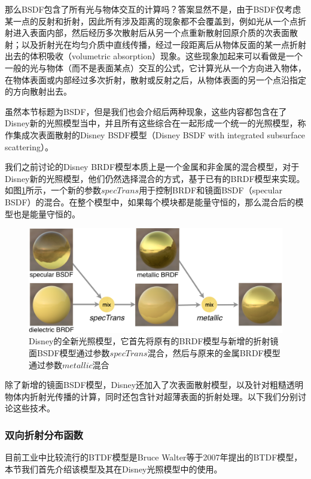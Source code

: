 那么BSDF包含了所有光与物体交互的计算吗？答案显然不是，由于BSDF仅考虑某一点的反射和折射，因此所有涉及距离的现象都不会覆盖到，例如光从一个点折射进入表面内部，然后经历多次散射后从另一个点重新散射回原介质的次表面散射；以及折射光在均匀介质中直线传播，经过一段距离后从物体反面的某一点折射出去的体积吸收（volumetric absorption）现象。这些现象加起来可以看做是一个一般的光与物体（而不是表面某点）交互的公式，它计算光从一个方向进入物体，在物体表面或内部经过多次折射，散射或反射之后，从物体表面的另一个点沿指定的方向散射出去。

虽然本节标题为BSDF，但是我们也会介绍后两种现象，这些内容都包含在了Disney新的光照模型当中，并且所有这些综合在一起形成一个统一的光照模型，称作集成次表面散射的Disney BSDF模型\cite{a:ExtendingtheDisneyBRDFtoaBSDFwithIntegratedSubsurfaceScattering}（Disney BSDF with integrated subsurface scattering）。

我们之前讨论的Disney BRDF模型本质上是一个金属和非金属的混合模型，对于Disney新的光照模型，他们仍然选择混合的方式，基于已有的BRDF模型来实现。如图\ref{f:intro-Disney-bsdf}所示，一个新的参数$specTrans$用于控制BRDF和镜面BSDF（specular BSDF）的混合。在整个模型中，如果每个模块都是能量守恒的，那么混合后的模型也是能量守恒的。

\begin{figure}
	\includegraphics[width=\textwidth]{figures/intro/Disney-bsdf}
	\caption{Disney的全新光照模型，它首先将原有的BRDF模型与新增的折射镜面BSDF模型通过参数$specTrans$混合，然后与原来的金属BRDF模型通过参数$metallic$混合}
	\label{f:intro-Disney-bsdf}
\end{figure}

除了新增的镜面BSDF模型，Disney还加入了次表面散射模型，以及针对粗糙透明物体内折射光传播的计算，同时还包含针对超薄表面的折射处理。以下我们分别讨论这些技术。





\subsubsection{双向折射分布函数}
目前工业中比较流行的BTDF模型是Bruce Walter等\cite{a:Microfacetmodelsforrefractionthroughroughsurfaces}于2007年提出的BTDF模型，本节我们首先介绍该模型及其在Disney光照模型中的使用。

